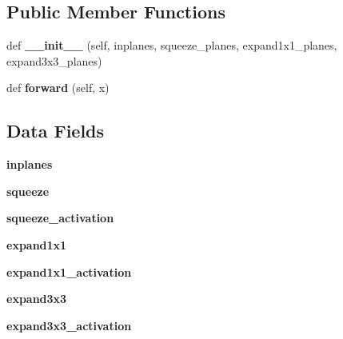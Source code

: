 \subsection*{Public Member Functions}
\begin{DoxyCompactItemize}
\item 
\mbox{\label{classtorchvision_1_1models_1_1squeezenet_1_1Fire_aaf2c06353e385293f9f06c345447e6b7}} 
def {\bfseries \+\_\+\+\_\+init\+\_\+\+\_\+} (self, inplanes, squeeze\+\_\+planes, expand1x1\+\_\+planes, expand3x3\+\_\+planes)
\item 
\mbox{\label{classtorchvision_1_1models_1_1squeezenet_1_1Fire_a970b6f37ec14d2c64256f17e7443d231}} 
def {\bfseries forward} (self, x)
\end{DoxyCompactItemize}
\subsection*{Data Fields}
\begin{DoxyCompactItemize}
\item 
\mbox{\label{classtorchvision_1_1models_1_1squeezenet_1_1Fire_a308283ce85325d58c68f5cb894b2c9cd}} 
{\bfseries inplanes}
\item 
\mbox{\label{classtorchvision_1_1models_1_1squeezenet_1_1Fire_a87a328ca8ee9fc6bf548ca12bbe216d3}} 
{\bfseries squeeze}
\item 
\mbox{\label{classtorchvision_1_1models_1_1squeezenet_1_1Fire_a295bab9180965f347aa59d5a32c2b3e7}} 
{\bfseries squeeze\+\_\+activation}
\item 
\mbox{\label{classtorchvision_1_1models_1_1squeezenet_1_1Fire_a595e353485664de0b6a5152068d5c6be}} 
{\bfseries expand1x1}
\item 
\mbox{\label{classtorchvision_1_1models_1_1squeezenet_1_1Fire_a11d410d6c1b09889df6069bbce3f7cfb}} 
{\bfseries expand1x1\+\_\+activation}
\item 
\mbox{\label{classtorchvision_1_1models_1_1squeezenet_1_1Fire_a6b7ee195337193e536c5b9db099e3866}} 
{\bfseries expand3x3}
\item 
\mbox{\label{classtorchvision_1_1models_1_1squeezenet_1_1Fire_a012cbda61f32f7d4c787e60c0903460e}} 
{\bfseries expand3x3\+\_\+activation}
\end{DoxyCompactItemize}


